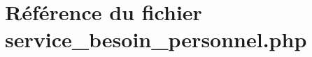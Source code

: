 \hypertarget{service__besoin__personnel_8php}{
\section{R\'{e}f\'{e}rence du fichier service\_\-besoin\_\-personnel.php}
\label{service__besoin__personnel_8php}
}
